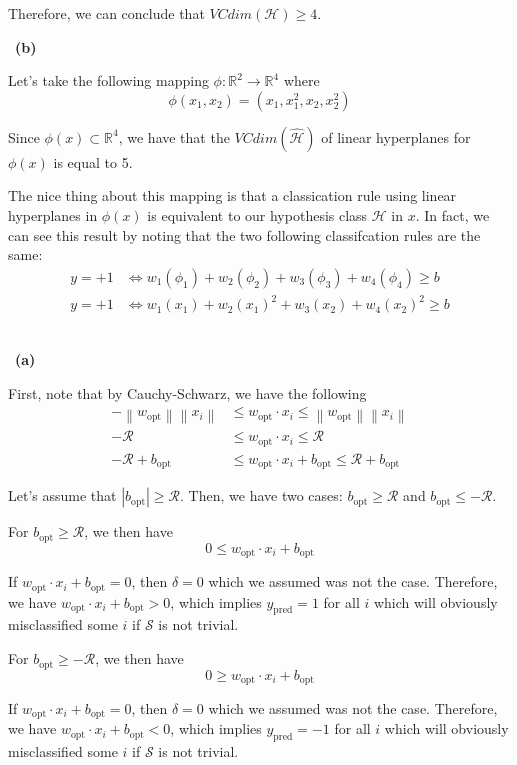 \documentclass[a4 paper, 15pt]{article}
\newcommand{\norm}[1]{\left\lVert#1\right\rVert}
\numberwithin{equation}{section}
\newcommand{\problem}[1]{~\\\fbox{\textbf{Problem #1}}\newline\newline}
\newcommand{\subproblem}[1]{~\newline\textbf{(#1)}}
\begin{document}
Therefore, we can conclude that $VCdim(\mathcal{H})\geq 4$.

\subproblem{b}

Let's take the following mapping $\phi:\mathbb{R}^2\rightarrow \mathbb{R}^4$ where
\[
\phi(x_1,x_2) = (x_1, x_1^2, x_2, x_2^2)
\]

Since $\phi(x)\subset \mathbb{R}^4$, we have that the $VCdim(\mathcal{\hat{H}})$ of linear hyperplanes for $\phi(x)$ is equal to 5.

The nice thing about this mapping is that a classication rule using linear hyperplanes in $\phi(x)$ is equivalent to our hypothesis class $\mathcal{H}$ in $x$. In fact, we can see this result by noting that the two following classifcation rules are the same:
\begin{align*}
  y = +1 & \Leftrightarrow w_1(\phi_1)+w_2(\phi_2)+w_3(\phi_3)+w_4(\phi_4)\geq b \\
y = +1 & \Leftrightarrow  w_1(x_1)+w_2(x_1)^2+w_3(x_2)+w_4(x_2)^2\geq b
\end{align*}

\newpage
\problem{2}
\subproblem{a}

First, note that by Cauchy-Schwarz, we have the following
\begin{align*}
-\norm{w_{\text{opt}}}\norm{x_i}&\leq  w_{\text{opt}}\cdot x_i \leq \norm{w_{\text{opt}}}\norm{x_i}\\
-\mathcal{R}&\leq  w_{\text{opt}}\cdot x_i \leq \mathcal{R}\\
-\mathcal{R}+b_{\text{opt}} &\leq  w_{\text{opt}}\cdot x_i +b_{\text{opt}} \leq \mathcal{R}+b_{\text{opt}}
\end{align*}

Let's assume that $|b_{\text{opt}}|\geq \mathcal{R}$. Then, we have two cases: $b_{\text{opt}}\geq \mathcal{R}$ and $b_{\text{opt}}\leq -\mathcal{R}$.

For $b_{\text{opt}}\geq \mathcal{R}$, we then have
\[
0 \leq  w_{\text{opt}}\cdot x_i +b_{\text{opt}}
\]

If $w_{\text{opt}}\cdot x_i +b_{\text{opt}} = 0$, then $\delta = 0$ which we assumed was not the case. Therefore, we have $w_{\text{opt}}\cdot x_i +b_{\text{opt}}>0$, which implies $y_{\text{pred}} = 1$ for all $i$ which will obviously misclassified some $i$ if $\mathcal{S}$ is not trivial.

For $b_{\text{opt}}\geq - \mathcal{R}$, we then have
\[
0 \geq  w_{\text{opt}}\cdot x_i +b_{\text{opt}}
\]

If $w_{\text{opt}}\cdot x_i +b_{\text{opt}} = 0$, then $\delta = 0$ which we assumed was not the case. Therefore, we have $w_{\text{opt}}\cdot x_i +b_{\text{opt}}<0$, which implies $y_{\text{pred}} = -1$ for all $i$ which will obviously misclassified some $i$ if $\mathcal{S}$ is not trivial.
\end{document}
